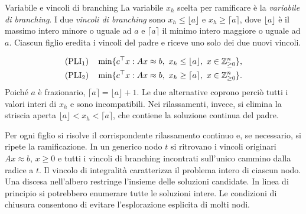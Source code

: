 \begin{definition}{Variabile e vincoli di branching}
La variabile $x_h$ scelta per ramificare è la \emph{variabile di branching}.
I due \emph{vincoli di branching} sono $x_h\leq\lfloor a\rfloor$ e
$x_h\geq\lceil a\rceil$, dove $\lfloor a\rfloor$ è il massimo intero
minore o uguale ad $a$ e $\lceil a\rceil$ il minimo intero maggiore o
uguale ad $a$. Ciascun figlio eredita i vincoli del padre e riceve uno
solo dei due nuovi vincoli.
\end{definition}

\[
\begin{aligned}
 (\mathrm{PLI}_{1})\quad &\min\{c^\top x:Ax\approx b,\ x_h\leq\lfloor a\rfloor,\
                          x\in\mathbb Z^n_{\geq0}\},\\
 (\mathrm{PLI}_{2})\quad &\min\{c^\top x:Ax\approx b,\ x_h\geq\lceil a\rceil,\
                          x\in\mathbb Z^n_{\geq0}\}.
\end{aligned}
\]
Poiché $a$ è frazionario, $\lceil a\rceil=\lfloor a\rfloor+1$.
Le due alternative coprono perciò tutti i valori interi di $x_h$ e sono
incompatibili. Nei rilassamenti, invece, si elimina la striscia aperta
$\lfloor a\rfloor<x_h<\lceil a\rceil$, che contiene la soluzione
continua del padre.

\begin{center}
\end{center}

Per ogni figlio si risolve il corrispondente rilassamento continuo e,
se necessario, si ripete la ramificazione. In un generico nodo $t$ si
ritrovano i vincoli originari $Ax\approx b$, $x\geq0$ e tutti i vincoli
di branching incontrati sull'unico cammino dalla radice a $t$.
Il vincolo di integralità caratterizza il problema intero di ciascun nodo.
Una discesa nell'albero restringe l'insieme delle soluzioni candidate.
In linea di principio si potrebbero enumerare tutte le soluzioni intere.
Le condizioni di chiusura consentono di evitare l'esplorazione esplicita
di molti nodi.

